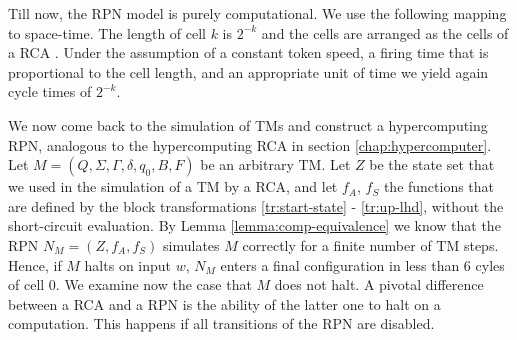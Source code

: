 \documentclass[pre,amssymb,showpacs,showkeys,preprint]{revtex4}
\begin{document}
Till now, the RPN model is purely computational.
We use the following mapping to space-time.
The length of cell $k$ is $2^{-k}$ and the cells are arranged as the cells of a RCA .
Under the assumption of a constant token speed, a firing time that is  proportional to the cell length,
and an appropriate unit of time
we yield  again cycle times of $2^{-k}$.

We now come back to the simulation of TMs and construct a hypercomputing RPN, analogous to the
hypercomputing RCA in section \ref{chap:hypercomputer}.
Let $M = (Q, \Sigma, \Gamma, \delta, q_0, B, F)$ be an arbitrary TM.
Let $Z$ be the state set that we used in the simulation of a TM by a RCA, and let
$f_A$, $f_S$ the functions that are defined by the block transformations \ref{tr:start-state} - \ref{tr:up-lhd},
without the short-circuit evaluation.
By Lemma \ref{lemma:comp-equivalence} we know that the RPN $N_M = (Z, f_A, f_S)$ simulates $M$ correctly for a finite number of TM steps.
Hence, if $M$ halts on input $w$, $N_M$ enters a final configuration in less than 6 cyles of cell 0.
We examine now the case that $M$ does not halt.
A pivotal difference between a RCA and a RPN is the ability of the latter one to halt on a computation.
This happens if all transitions of the RPN are disabled.
\end{document}
